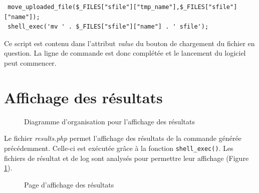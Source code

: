 \begin{DDbox}{\linewidth}
\begin{lstlisting}
 move_uploaded_file($_FILES["sfile"]["tmp_name"],$_FILES["sfile"]["name"]);
 shell_exec('mv ' . $_FILES["sfile"]["name"] . ' sfile');
\end{lstlisting}
\end{DDbox}

Ce script est contenu dans l'attribut \textit{value} du bouton de chargement du fichier en question. La ligne de commande est donc complétée et le lancement du logiciel peut commencer. 

\section{Affichage des résultats}

\begin{figure}[!ht]
	\begin{center}
		\caption{Diagramme d'organisation pour l'affichage des résultats}
  		\label{DiagResults}
  	\end{center}	
\end{figure}

Le fichier \emph{results.php} permet l'affichage des résultats de la commande générée précédemment. Celle-ci est exécutée grâce à la fonction \texttt{shell\_exec()}. Les fichiers de résultat et de log sont analysés pour permettre leur affichage (Figure \ref{DiagResults}).\\

\begin{figure}[!ht]
	\begin{center}
		\caption{Page d'affichage des résultats}
  		\label{Results}
  	\end{center}	
\end{figure}

